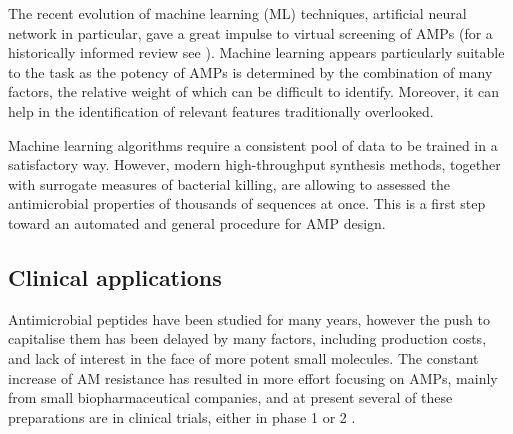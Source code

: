 The recent evolution of machine learning (ML) techniques, artificial neural network in particular, gave a great impulse to virtual screening of AMPs (for a historically informed review see \citep{Fjell2011,Veltri2018}). Machine learning appears particularly suitable to the task as the potency of AMPs is determined by the combination of many factors, the relative weight of which can be difficult to identify. Moreover, it can help in the identification of relevant features traditionally overlooked.

Machine learning algorithms require a consistent pool of data to be trained in a satisfactory way. However, modern high-throughput synthesis methods, together with surrogate measures of bacterial killing, are allowing to assessed the antimicrobial properties of thousands of sequences at once\citep{Cherkasov2009}. This is a first step toward an automated and general procedure for AMP design.

%
%

%

\subsection{Clinical applications}
Antimicrobial peptides have been studied for many years, however the push to capitalise them has been delayed by many factors, including production costs, and lack of interest in the face of more potent small molecules.
%
The constant increase of AM resistance has resulted in more effort focusing on AMPs, mainly from small biopharmaceutical companies, and at present several of these preparations are in clinical trials, either in phase 1 or 2 \citep{Naafs2018}.


